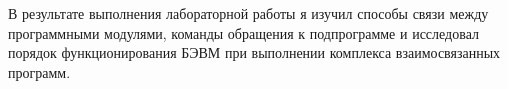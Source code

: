 В результате выполнения лабораторной работы я изучил способы связи между программными модулями,
команды обращения к подпрограмме и исследовал порядок функционирования
БЭВМ при выполнении комплекса взаимосвязанных программ.